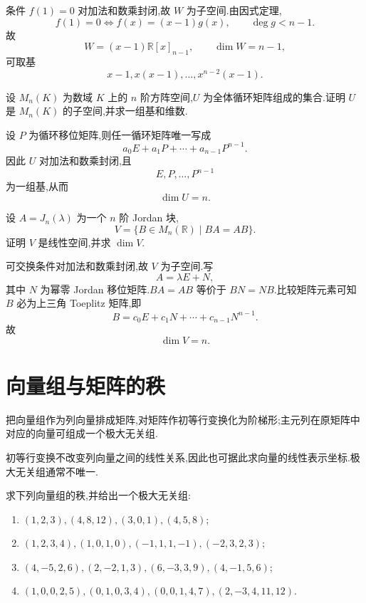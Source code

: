 \begin{solution}
条件 $f(1)=0$ 对加法和数乘封闭,故 $W$ 为子空间.由因式定理,
\[
 f(1)=0\iff f(x)=(x-1)g(x),\qquad \deg g<n-1.
\]
故
\[
 W=(x-1)\mathbb{R}[x]_{n-1},
 \qquad \dim W=n-1,
\]
可取基
\[
 \boxed{x-1,x(x-1),\ldots,x^{n-2}(x-1)}.
\]
\end{solution}

\begin{example}
设 $M_n(K)$ 为数域 $K$ 上的 $n$ 阶方阵空间,$U$ 为全体循环矩阵组成的集合.证明 $U$ 是 $M_n(K)$ 的子空间,并求一组基和维数.
\end{example}
\exampleblank

\begin{solution}
设 $P$ 为循环移位矩阵,则任一循环矩阵唯一写成
\[
 a_0E+a_1P+\cdots+a_{n-1}P^{n-1}.
\]
因此 $U$ 对加法和数乘封闭,且
\[
 \boxed{E,P,\ldots,P^{n-1}}
\]
为一组基,从而
\[
 \boxed{\dim U=n}.
\]
\end{solution}

\begin{example}
设 $A=J_n(\lambda)$ 为一个 $n$ 阶 Jordan 块,
\[
V=\{B\in M_n(\mathbb{R})\mid BA=AB\}.
\]
证明 $V$ 是线性空间,并求 $\dim V$.
\end{example}
\exampleblank

\begin{solution}
可交换条件对加法和数乘封闭,故 $V$ 为子空间.写
\[
 A=\lambda E+N,
\]
其中 $N$ 为幂零 Jordan 移位矩阵.$BA=AB$ 等价于 $BN=NB$.比较矩阵元素可知 $B$ 必为上三角 Toeplitz 矩阵,即
\[
 B=c_0E+c_1N+\cdots+c_{n-1}N^{n-1}.
\]
故
\[
 \boxed{\dim V=n}.
\]
\end{solution}


\newpage

\section{向量组与矩阵的秩}

\begin{proposition}
把向量组作为列向量排成矩阵,对矩阵作初等行变换化为阶梯形;主元列在原矩阵中对应的向量可组成一个极大无关组.
\end{proposition}

\begin{remark}
初等行变换不改变列向量之间的线性关系,因此也可据此求向量的线性表示坐标.极大无关组通常不唯一.
\end{remark}

\begin{example}
求下列向量组的秩,并给出一个极大无关组:
\begin{enumerate}
  \item $(1,2,3),(4,8,12),(3,0,1),(4,5,8)$;
  \item $(1,2,3,4),(1,0,1,0),(-1,1,1,-1),(-2,3,2,3)$;
  \item $(4,-5,2,6),(2,-2,1,3),(6,-3,3,9),(4,-1,5,6)$;
  \item $(1,0,0,2,5),(0,1,0,3,4),(0,0,1,4,7),(2,-3,4,11,12)$.
\end{enumerate}
\end{example}
\exampleblank

